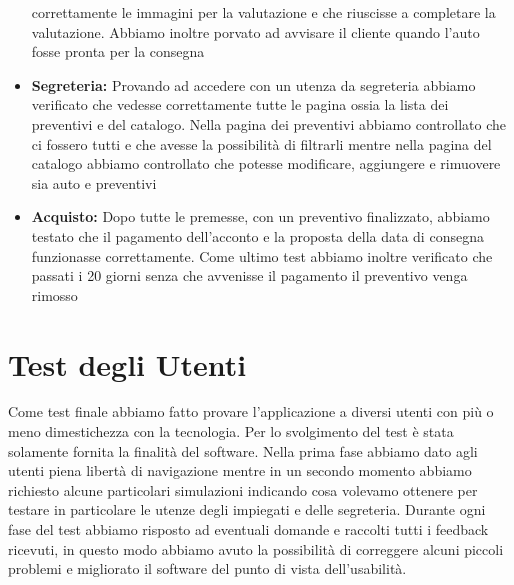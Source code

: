 \documentclass[a4paper, 11pt,oneside]{book}
\begin{document}
\begin{itemize}
            correttamente le immagini per la valutazione e che riuscisse a completare la valutazione. Abbiamo inoltre porvato ad avvisare il cliente quando l'auto fosse pronta per la consegna
            \item \textbf{Segreteria:} Provando ad accedere con un utenza da segreteria abbiamo verificato che vedesse correttamente tutte le pagina ossia la lista dei preventivi e del catalogo. Nella pagina dei preventivi abbiamo controllato che ci fossero tutti e che avesse la possibilità di filtrarli mentre
            nella pagina del catalogo abbiamo controllato che potesse modificare, aggiungere e rimuovere sia auto e preventivi
            \item \textbf{Acquisto:} Dopo tutte le premesse, con un preventivo finalizzato, abbiamo testato che il pagamento dell'acconto e la proposta della data di consegna funzionasse correttamente. Come ultimo test abbiamo inoltre verificato che passati i 20 giorni senza che avvenisse il pagamento il preventivo
            venga rimosso
        \end{itemize}
    \section{Test degli Utenti}
    Come test finale abbiamo fatto provare l'applicazione a diversi utenti con più o meno dimestichezza con la tecnologia. Per lo svolgimento del test è stata solamente fornita la finalità del software. Nella prima fase abbiamo dato agli utenti piena libertà di navigazione mentre in un secondo momento abbiamo richiesto
    alcune particolari simulazioni indicando cosa volevamo ottenere per testare in particolare le utenze degli impiegati e delle segreteria. Durante ogni fase del test abbiamo risposto ad eventuali domande e raccolti tutti i feedback ricevuti, in questo modo abbiamo avuto la possibilità di correggere alcuni piccoli problemi e migliorato
    il software del punto di vista dell'usabilità.


\end{document}
